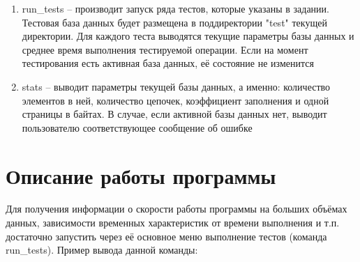 \documentclass[12pt, a4paper]{fallen_report}
\begin{document}
\begin{enumerate}
\item {\consolas run\_tests} – производит запуск ряда тестов, которые указаны в задании. Тестовая база данных будет размещена в поддиректории "test" текущей директории. Для каждого теста выводятся текущие параметры базы данных и среднее время выполнения тестируемой операции. Если на момент тестирования есть активная база данных, её состояние не изменится

\item {\consolas stats} – выводит параметры текущей базы данных, а именно: количество элементов в ней, количество цепочек, коэффициент заполнения и одной страницы в байтах. В случае, если активной базы данных нет, выводит пользователю соответствующее сообщение об ошибке
\end{enumerate}

\pagebreak
\section{Описание работы программы}
Для получения информации о скорости работы программы на больших объёмах данных, зависимости временных характеристик от времени выполнения и т.п. достаточно запустить через её основное меню выполнение тестов (команда {\consolas run\_tests}). Пример вывода данной команды:
\end{document}

